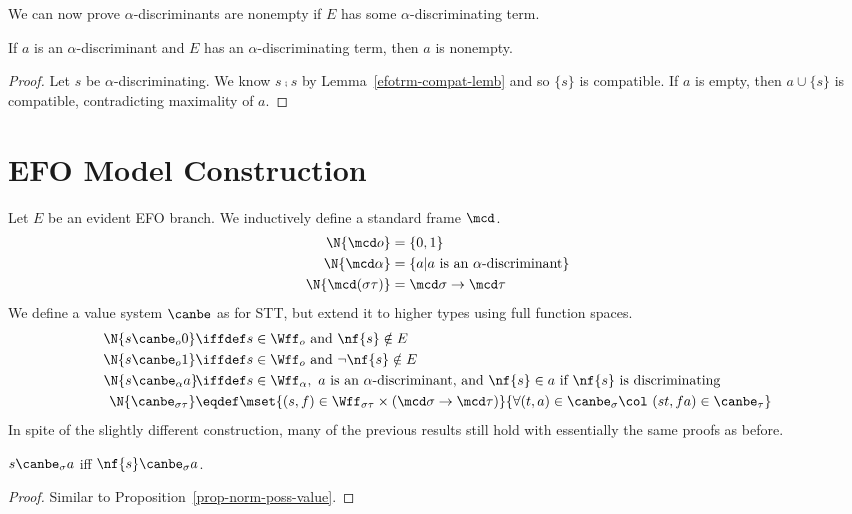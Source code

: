 We can now prove $\alpha$-discriminants are nonempty if $E$ has some $\alpha$-discriminating term.

\begin{lem}
  \label{discr-nonempty}
  If $a$ is an $\alpha$-discriminant and $E$ has an $\alpha$-discriminating term, then
  $a$ is nonempty.
\end{lem}
\begin{proof}
  Let $s$ be $\alpha$-discriminating. We know $s\comp s$ by Lemma~\ref{efotrm-compat-lemb} and so $\{s\}$ is compatible.  If $a$ is empty, then $a\cup\{s\}$ is compatible, contradicting
  maximality of $a$.
\end{proof}

\section{EFO Model Construction}

Let $E$ be an evident EFO branch.  
We inductively define a standard frame $\mcd$.
\begin{align*}
  \N{\mcd o}& = \{0,1\} \\
  \N{\mcd\alpha}& = \{a | a  {\mbox{ is an $\alpha$-discriminant}}\} \\
  \N{\mcd(\sigma\tau)}& = \mcd\sigma \to \mcd\tau
\end{align*}
We define a value system $\canbe$ as for STT, but extend it to higher types using full function spaces.
\begin{align*}
  \N{s \canbe_o 0}&\iffdef s\in\Wff_o \text{ and } \nf{s}\notin E\\
  \N{s \canbe_o 1}&\iffdef s\in\Wff_o \text{ and } \neg\nf{s}\notin E\\
  \N{s\canbe_\alpha a}\!&\iffdef 
  s\in\Wff_\alpha,~a \text{ is an $\alpha$-discriminant, and } 
  \nf{s}\in a \text{ if } \nf{s} \text{ is discriminating}\\
  \N{\canbe_{\sigma\tau}}&\eqdef\mset{(s,f)\in\Wff_{\sigma\tau}\times(\mcd\sigma\to\mcd\tau)}
  {\forall(t,a)\in\canbe_\sigma\col~(st,fa)\in\canbe_\tau}
\end{align*}
In spite of the slightly different construction, many of the previous results still hold
with essentially the same proofs as before.

\begin{prop}
  \label{efo-prop-norm-poss-value}
  $s\canbe_\sigma a$ iff $\nf{s}\canbe_\sigma a$.
\end{prop}
\begin{proof}  Similar to Proposition~\ref{prop-norm-poss-value}.
\end{proof}

